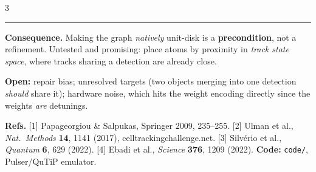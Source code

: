 \documentclass{article}
\newcommand{\bodyfont}{\fontsize{19}{23}\selectfont}
\newcommand{\capfont}{\fontsize{16}{20}\selectfont}
\newcommand{\keybox}[2]{%
  \par\vspace{2mm}%
  {\color{#1}\rule{\linewidth}{1.2mm}}\par\vspace{-1mm}
  \colorbox{nblight}{\begin{minipage}{\dimexpr\linewidth-2\fboxsep\relax}
    \vspace{1mm}\bodyfont #2\vspace{1mm}
  \end{minipage}}\par\vspace{2mm}}
\begin{document}
\begin{multicols}{3}
\keybox{nbaccent}{\textbf{Consequence.} Making the graph \emph{natively}
unit-disk is a \textbf{precondition}, not a refinement. Untested and promising:
place atoms by proximity in \emph{track state space}, where tracks sharing a
detection are already close.}

\textbf{Open:} repair bias; unresolved targets (two objects merging into one
detection \emph{should} share it); hardware noise, which hits the weight encoding
directly since the weights \emph{are} detunings.

\vspace{3mm}
{\capfont
\textbf{Refs.} [1] Papageorgiou \& Salpukas, Springer 2009, 235--255.
[2] Ulman et al., \emph{Nat.\ Methods} \textbf{14}, 1141 (2017),
celltrackingchallenge.net. [3] Silv\'erio et al., \emph{Quantum} \textbf{6}, 629
(2022). [4] Ebadi et al., \emph{Science} \textbf{376}, 1209 (2022).
\quad\textbf{Code:} \texttt{code/}, Pulser/QuTiP emulator.}

\end{multicols}
\end{document}
